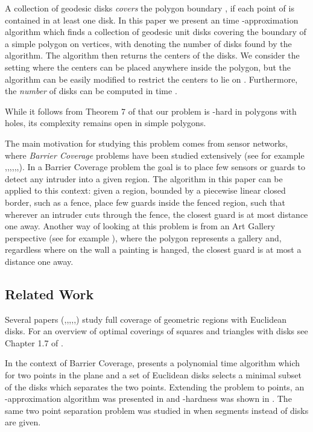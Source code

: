 \documentclass{llncs}
\begin{document}
A collection of geodesic disks \emph{covers} the polygon boundary , if each point of  is contained in at least one disk. In this paper we present an  time -approximation algorithm which finds a collection of geodesic unit disks covering the boundary of a simple polygon on  vertices, with  denoting the number of disks found by the algorithm. The algorithm then returns the centers of the disks. {We consider the setting where the centers can be placed anywhere inside the polygon, but the algorithm can be easily modified to restrict the centers to lie on .}  Furthermore, the \emph{number} of disks can be computed in time .

  
While it follows from Theorem 7 of \cite{viganPack} that our problem is -hard in polygons with holes, its complexity remains open in simple polygons.

The main motivation for studying this problem comes from sensor networks, where {\emph{Barrier Coverage} problems have been studied extensively} (see for example \cite{conf/algosensors/BeregK09},\cite{5210107},\cite{Chen:2008:MGQ:1374618.1374674},\cite{Kumar:20059},\cite{Liu:2008:SBC:1374618.1374673},\cite{conf/infocom/SaipullaWLW09},\cite{4520201}). In a Barrier Coverage problem the goal is to place few sensors or guards to detect any intruder into a given region. {The algorithm in this paper can be applied to this context}: given a region, bounded by a piecewise linear closed border, such as a fence, place few guards inside the fenced region, such that wherever an intruder cuts through the fence, the closest guard is at most distance one away. Another way of looking at this problem is from an Art Gallery perspective (see for example \cite{ORourke:1987:AGT:40599}), where the polygon represents a gallery and, regardless where on the wall a painting is hanged, the closest guard is at most a distance one away.


\subsection{Related Work}
Several papers (\cite{Funke:2007},\cite{Huang:2003},\cite{1939},\cite{ijdsn/Ko12},\cite{936985},\cite{6226360}) study full coverage of geometric regions with Euclidean disks. For an overview of optimal coverings of squares and triangles with disks see Chapter 1.7  of \cite{unsolv2}. 

In the context of Barrier Coverage, \cite{Cabello:2013:CSP:2462356.2462383} presents a polynomial time algorithm which for two points in the plane and a set of Euclidean disks selects a minimal subset of the disks which separates the two points. Extending the problem to  points, an -approximation algorithm was presented in \cite{Gibson:2011:IPU:2040572.2040580} and -hardness was shown in \cite{DBLP:journals/corr/abs-1303-2779}. The same two point separation problem was studied in \cite{minCellCon} when segments instead of disks are given.
\end{document}
